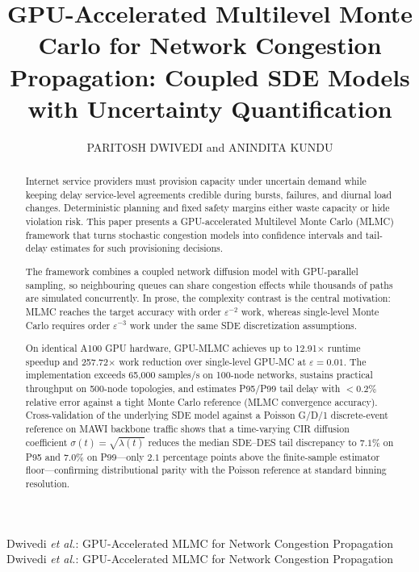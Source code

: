 \documentclass{ieeeaccess}
\begin{document}

\title{GPU-Accelerated Multilevel Monte Carlo for Network Congestion Propagation: Coupled SDE Models with Uncertainty Quantification}

\author{\uppercase{Paritosh Dwivedi} and
        \uppercase{Anindita Kundu}}
\address[1]{Vellore Institute of Technology, Vellore, India
(e-mail: \url{paritosh.dwivedi2024@vitstudent.ac.in})}
\address[2]{Vellore Institute of Technology, Vellore, India
(e-mail: anindita.kundu@vit.ac.in)}
\markboth
{Dwivedi \emph{et al.}: GPU-Accelerated MLMC for Network Congestion Propagation}
{Dwivedi \emph{et al.}: GPU-Accelerated MLMC for Network Congestion Propagation}

\begin{abstract}
Internet service providers must provision capacity under uncertain demand while keeping delay
service-level agreements credible during bursts, failures, and diurnal load changes. Deterministic
planning and fixed safety margins either waste capacity or hide violation risk. This paper presents
a GPU-accelerated Multilevel Monte Carlo (MLMC) framework that turns stochastic congestion
models into confidence intervals and tail-delay estimates for such provisioning decisions.

The framework combines a coupled network diffusion model with GPU-parallel sampling, so
neighbouring queues can share congestion effects while thousands of paths are simulated
concurrently. In prose, the complexity contrast is the central motivation: MLMC reaches the
target accuracy with order $\varepsilon^{-2}$ work, whereas single-level Monte Carlo requires
order $\varepsilon^{-3}$ work under the same SDE discretization assumptions.

On identical A100 GPU hardware, GPU-MLMC achieves up to 12.91$\times$ runtime speedup and
257.72$\times$ work reduction over single-level GPU-MC at $\varepsilon=0.01$. The implementation
exceeds 65,000 samples/s on 100-node networks, sustains practical throughput on 500-node
topologies, and estimates P95/P99 tail delay with $<0.2\%$ relative error against a tight
Monte Carlo reference (MLMC convergence accuracy). Cross-validation of the underlying SDE
model against a Poisson G/D/1 discrete-event reference on MAWI backbone traffic shows that
a time-varying CIR diffusion coefficient $\sigma(t){=}\sqrt{\lambda(t)}$ reduces the median
SDE--DES tail discrepancy to $7.1\%$ on P95 and $7.0\%$ on P99---only $2.1$ percentage points
above the finite-sample estimator floor---confirming distributional parity with the Poisson
reference at standard binning resolution.
\end{abstract}
\end{document}
